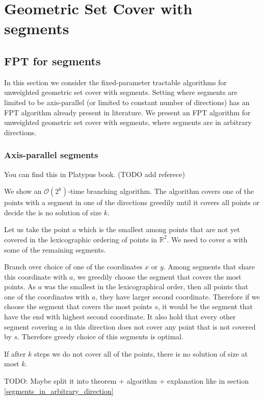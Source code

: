 \chapter{Geometric Set Cover with segments}

\section{FPT for segments}
In this section we consider the fixed-parameter tractable
algorithms for unweighted geometric set cover with segments.
Setting where segments are limited to be axis-parallel
(or limited to constant number of directions) has an FPT
algorithm already present in literature.
We present an FPT algorithm for unweighted geometric set cover
with segments, where segments are in arbitrary directions.

\subsection{Axis-parallel segments}
You can find this in Platypus book. (TODO add referece)

We show an $\mathcal{O}(2^k)$-time branching algorithm.
The algorithm covers one of the points with
a segment in one of the directions greedily until
it covers all points or decide the is no solution of size $k$.

Let us take
the point $a$ which is the smallest 
among points that are not yet covered
in the lexicographic ordering
of points in $\mathbb{R}^2$.
We need to cover $a$ with some of the remaining segments.

Branch over choice of one of the coordinates $x$ or $y$.
Among segments that share this coordinate with $a$,
we greedily choose the segment that covers the most points.
As $a$ was the smallest in the lexicographical order,
then all points that one of the coordinates with $a$,
they have larger second coordinate. Therefore
if we choose the segment that covers the most
points $s$, it would
be the segment that have the end with highest second coordinate.
It also hold that every other segment covering $a$
in this direction does not cover any point that
is not covered by $s$. Therefore greedy choice
of this segments is optimal.

If after $k$ steps we do not cover all of the points, there is no solution
of size at most $k$.

TODO: Maybe split it into theorem + algorithm + explanation like in 
section
\ref{segments_in_arbitrary_direction}

